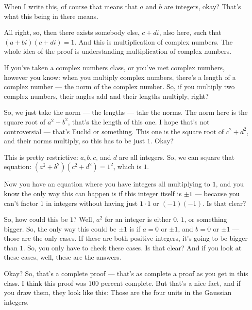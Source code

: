 \begin{speech}[00:02:45 - 00:03:55]
When I write this, of course that means that $a$ and $b$ are integers, okay?  That's what this being in there means.

All right, so, then there exists somebody else, $c + di$, also here,  such that $(a+bi)(c+di) = 1$.  And this is multiplication of complex numbers. The whole idea of the proof is understanding multiplication of complex numbers.

If you've taken a complex numbers class, or you've met complex numbers, however you know: when you multiply complex numbers, there's a length of a complex number  --- the norm of the complex number. So, if you multiply two complex numbers, their angles add and their lengths multiply, right?

So, we just take the norm --- the lengths --- take the norms.  The norm here is the square root of $a^2 + b^2$,  that's the length of this one. I hope that's not controversial --- that's Euclid or something. This one is the square root of $c^2 + d^2$,  and their norms multiply, so this has to be just $1$.  Okay?
\end{speech}

\begin{speech}[00:03:55 - 00:05:14]
This is pretty restrictive: $a, b, c$, and $d$ are all integers. So, we can square that equation:  $(a^2 + b^2)(c^2 + d^2) = 1^2$, which is $1$.

Now you have an equation where you have integers all multiplying to $1$, and you know the only way this can happen is if this integer itself is $\pm 1$ --- because you can't factor $1$ in integers without having just $1 \cdot 1$ or $(-1)(-1)$. Is that clear?

So, how could this be $1$? Well, $a^2$ for an integer is either $0$, $1$, or something bigger. So, the only way this could be $\pm 1$ is if $a = 0$ or $\pm 1$, and $b = 0$ or $\pm 1$  --- those are the only cases. If these are both positive integers, it's going to be bigger than $1$. So, you only have to check these cases. Is that clear? And if you look at these cases, well, these are the answers. 

Okay? So, that's a complete proof --- that's as complete a proof as you get in this class. I think this proof was $100$ percent complete. But that's a nice fact, and if you draw them, they look like this:  Those are the four units in the Gaussian integers.
\end{speech}

